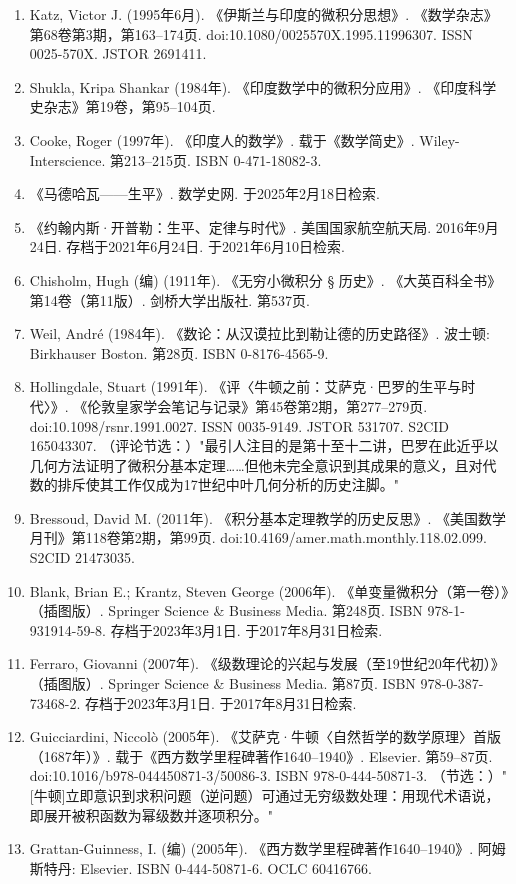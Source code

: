 \begin{enumerate}
\item Katz, Victor J. (1995年6月). 《伊斯兰与印度的微积分思想》. 《数学杂志》第68卷第3期，第163–174页. doi:10.1080/0025570X.1995.11996307. ISSN 0025-570X. JSTOR 2691411.  
\item Shukla, Kripa Shankar (1984年). 《印度数学中的微积分应用》. 《印度科学史杂志》第19卷，第95–104页.  
\item Cooke, Roger (1997年). 《印度人的数学》. 载于《数学简史》. Wiley-Interscience. 第213–215页. ISBN 0-471-18082-3.  
\item 《马德哈瓦——生平》. 数学史网. 于2025年2月18日检索.  
\item 《约翰内斯·开普勒：生平、定律与时代》. 美国国家航空航天局. 2016年9月24日. 存档于2021年6月24日. 于2021年6月10日检索.  
\item Chisholm, Hugh (编) (1911年). 《无穷小微积分 § 历史》. 《大英百科全书》第14卷（第11版）. 剑桥大学出版社. 第537页.  
\item Weil, André (1984年). 《数论：从汉谟拉比到勒让德的历史路径》. 波士顿: Birkhauser Boston. 第28页. ISBN 0-8176-4565-9.  
\item Hollingdale, Stuart (1991年). 《评〈牛顿之前：艾萨克·巴罗的生平与时代〉》. 《伦敦皇家学会笔记与记录》第45卷第2期，第277–279页. doi:10.1098/rsnr.1991.0027. ISSN 0035-9149. JSTOR 531707. S2CID 165043307.  
（评论节选：）"最引人注目的是第十至十二讲，巴罗在此近乎以几何方法证明了微积分基本定理……但他未完全意识到其成果的意义，且对代数的排斥使其工作仅成为17世纪中叶几何分析的历史注脚。"  
\item Bressoud, David M. (2011年). 《积分基本定理教学的历史反思》. 《美国数学月刊》第118卷第2期，第99页. doi:10.4169/amer.math.monthly.118.02.099. S2CID 21473035.  
\item Blank, Brian E.; Krantz, Steven George (2006年). 《单变量微积分（第一卷）》（插图版）. Springer Science & Business Media. 第248页. ISBN 978-1-931914-59-8. 存档于2023年3月1日. 于2017年8月31日检索.  
\item Ferraro, Giovanni (2007年). 《级数理论的兴起与发展（至19世纪20年代初）》（插图版）. Springer Science & Business Media. 第87页. ISBN 978-0-387-73468-2. 存档于2023年3月1日. 于2017年8月31日检索.  
\item Guicciardini, Niccolò (2005年). 《艾萨克·牛顿〈自然哲学的数学原理〉首版（1687年）》. 载于《西方数学里程碑著作1640–1940》. Elsevier. 第59–87页. doi:10.1016/b978-044450871-3/50086-3. ISBN 978-0-444-50871-3.  
（节选：）"[牛顿]立即意识到求积问题（逆问题）可通过无穷级数处理：用现代术语说，即展开被积函数为幂级数并逐项积分。"  
\item Grattan-Guinness, I. (编) (2005年). 《西方数学里程碑著作1640–1940》. 阿姆斯特丹: Elsevier. ISBN 0-444-50871-6. OCLC 60416766.  

\end{enumerate}
